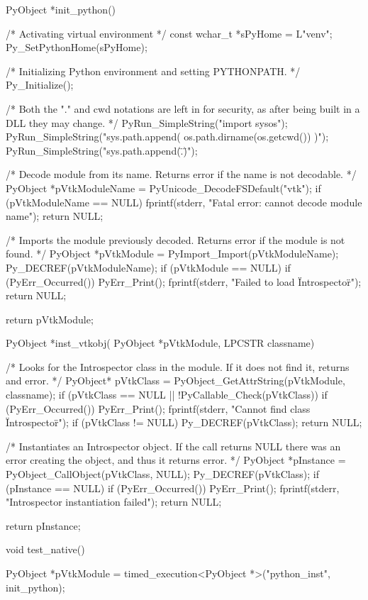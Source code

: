 \begin{appendices}
\begin{cpp}[label=lst:cpp-native-vtk,caption={Native C++ VTK benchmark source code.},aboveskip=20pt]
PyObject *init_python()
{
	/* Activating virtual environment */
	const wchar_t *sPyHome = L"venv";
	Py_SetPythonHome(sPyHome);

	/* Initializing Python environment and setting PYTHONPATH. */
	Py_Initialize();

	/* Both the "." and cwd notations are left in for security, as after being built in
		a DLL they may change. */
	PyRun_SimpleString("import sys\nimport os");
	PyRun_SimpleString("sys.path.append( os.path.dirname(os.getcwd()) )");
	PyRun_SimpleString("sys.path.append(\".\")");

	/* Decode module from its name. Returns error if the name is not decodable. */
	PyObject *pVtkModuleName = PyUnicode_DecodeFSDefault("vtk");
	if (pVtkModuleName == NULL)
	{
		fprintf(stderr, "Fatal error: cannot decode module name\n");
		return NULL;
	}

	/* Imports the module previously decoded. Returns error if the module is not found. */
	PyObject *pVtkModule = PyImport_Import(pVtkModuleName);
	Py_DECREF(pVtkModuleName);
	if (pVtkModule == NULL)
	{
		if (PyErr_Occurred())
		{
			PyErr_Print();
		}
		fprintf(stderr, "Failed to load \"Introspector\"\n");
		return NULL;
	}

	return pVtkModule;
}


PyObject *inst_vtkobj(
	PyObject *pVtkModule,
	LPCSTR classname)
{
	/* Looks for the Introspector class in the module. If it does not find it, returns and error. */
	PyObject* pVtkClass = PyObject_GetAttrString(pVtkModule, classname);
	if (pVtkClass == NULL || !PyCallable_Check(pVtkClass))
	{
		if (PyErr_Occurred())
		{
			PyErr_Print();
		}
		fprintf(stderr, "Cannot find class \"Introspector\"\n");
		if (pVtkClass != NULL)
		{
			Py_DECREF(pVtkClass);
		}
		return NULL;
	}

	/* Instantiates an Introspector object. If the call returns NULL there was an error
		creating the object, and thus it returns error. */
	PyObject *pInstance = PyObject_CallObject(pVtkClass, NULL);
	Py_DECREF(pVtkClass);
	if (pInstance == NULL)
	{
		if (PyErr_Occurred())
		{
			PyErr_Print();
		}
		fprintf(stderr, "Introspector instantiation failed\n");
		return NULL;
	}

	return pInstance;
}


void test_native()
{
	PyObject *pVtkModule = timed_execution<PyObject *>("python_inst", init_python);

}
\end{cpp}
\end{appendices}
